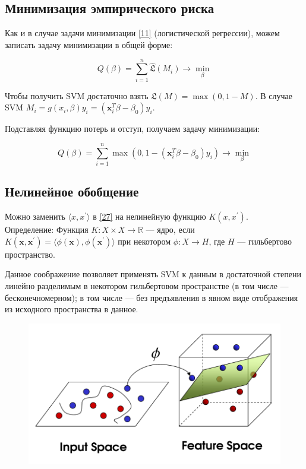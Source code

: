 \documentclass[11pt, oneside]{article}   	%
\begin{document}
\subsection{Минимизация эмпирического риска}

Как и в случае задачи минимизации \ref{11} (логистической регрессии), можем записать задачу минимизации в общей форме:

\begin{equation*} 
Q(\beta) = \sum\limits_{i = 1}^{n} \hat{\mathfrak{L}}( M_i )  \rightarrow \min\limits_{\beta}
\end{equation*}

Чтобы получить SVM достаточно взять $\hat{\mathfrak{L}}(M) = \max(0, 1 - M)$. В случае SVM $M_i = g(x_i, \beta)y_i = (\bm{x}_i^T \beta - \beta_0)y_i$.

Подставляя функцию потерь и отступ, получаем задачу минимизации:

\begin{equation} 
	Q(\beta) = \sum\limits_{i = 1}^{n} \max(0, 1 - (\bm{x}_i^T \beta - \beta_0)y_i)  \rightarrow \min\limits_{\beta}
	\label{27}
\end{equation}

\subsection{Нелинейное обобщение}
	Можно заменить $ \langle x, x^{'} \rangle $ в \ref{27} на нелинейную функцию $K( x, x^{'} )$. \\

	Определение: Функция $K: X \times X \rightarrow \mathbb{R}$ --- ядро, если $K(\bm{x}, \bm{x}^{'}) = \langle \phi(\bm{x}), \phi(\bm{x}^{'}) \rangle$ при некотором $\phi: X \rightarrow H$, где $H$ --- гильбертово пространство.
	
	Данное соображение позволяет применять SVM к данным в достаточной степени линейно разделимым в некотором гильбертовом пространстве (в том числе --- бесконечномерном); в том числе --- без предъявления в явном виде отображения из исходного пространства в данное.
	
	\begin{figure}[h]
		\centering
		\includegraphics[width=0.7\linewidth]{imgs/kernels}
	\end{figure}
\end{document}
